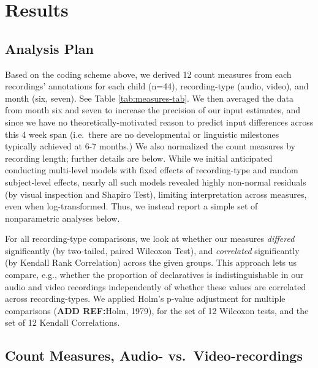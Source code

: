 \documentclass[floatsintext,man]{apa6}
\theoremstyle{definition}
\theoremstyle{definition}
\theoremstyle{definition}
\theoremstyle{remark}
\begin{document}
\section{Results}\label{results}

\subsection{Analysis Plan}\label{analysis-plan}

Based on the coding scheme above, we derived 12 count measures from each
recordings' annotations for each child (n=44), recording-type (audio,
video), and month (six, seven). See Table \ref{tab:measures-tab}. We
then averaged the data from month six and seven to increase the
precision of our input estimates, and since we have no
theoretically-motivated reason to predict input differences across this
4 week span (i.e.~there are no developmental or linguistic milestones
typically achieved at 6-7 months.) We also normalized the count measures
by recording length; further details are below. While we initial
anticipated conducting multi-level models with fixed effects of
recording-type and random subject-level effects, nearly all such models
revealed highly non-normal residuals (by visual inspection and Shapiro
Test), limiting interpretation across measures, even when
log-transformed. Thus, we instead report a simple set of nonparametric
analyses below.

For all recording-type comparisons, we look at whether our measures
\emph{differed} significantly (by two-tailed, paired Wilcoxon Test), and
\emph{correlated} significantly (by Kendall Rank Correlation) across the
given groups. This approach lets us compare, e.g., whether the
proportion of declaratives is indistinguishable in our audio and video
recordings independently of whether these values are correlated across
recording-types. We applied Holm's p-value adjustment for multiple
comparisons (\textbf{ADD REF:}Holm, 1979), for the set of 12 Wilcoxon
tests, and the set of 12 Kendall Correlations.

\subsection{Count Measures, Audio-
vs.~Video-recordings}\label{count-measures-audio--vs.video-recordings}
\end{document}
